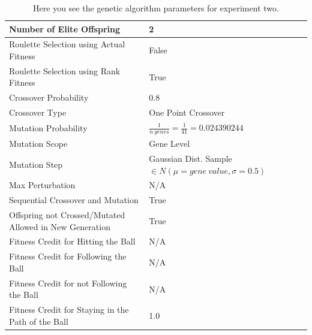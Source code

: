 \documentclass[a4paper,10pt]{article}
\begin{document}
\begin{table}[H]
\footnotesize
\begin{tabular}{ >{\columncolor[gray]{0.8}} l | l }
\hline
Number of Elite Offspring                                            & 2                                                                 \\ \hline
Roulette Selection using Actual Fitness                              & False                                                             \\ \hline
Roulette Selection using Rank Fitness                                & True                                                              \\ \hline
Crossover Probability                                                & 0.8                                                               \\ \hline
Crossover Type                                                       & One Point Crossover                                               \\ \hline
Mutation Probability                                                 & $\frac{1}{n \ genes}=\frac{1}{41} = 0.024390244$                  \\ \hline
Mutation Scope                                                       & Gene Level                                                        \\ \hline
Mutation Step                                                        & Gaussian Dist. Sample $\in N(\mu=gene \ value, \sigma = 0.5)$     \\ \hline
Max Perturbation                                                     & N/A                                                       	 \\ \hline
Sequential Crossover and Mutation                                    & True                                                      	 \\ \hline
Offspring not Crossed/Mutated Allowed in New Generation              & True                                                     	 \\ \hline
Fitness Credit for Hitting the Ball                                  & N/A                                                      	 \\ \hline
Fitness Credit for Following the Ball                                & N/A                                                      	 \\ \hline
Fitness Credit for not Following the Ball                            & N/A                                                      	 \\ \hline
Fitness Credit for Staying in the Path of the Ball                   & 1.0                                                      	 \\ \hline
\end{tabular}
\caption{Here you see the genetic algorithm parameters for experiment two.}
\label{tab:exp2}
\end{table}
\end{document}
